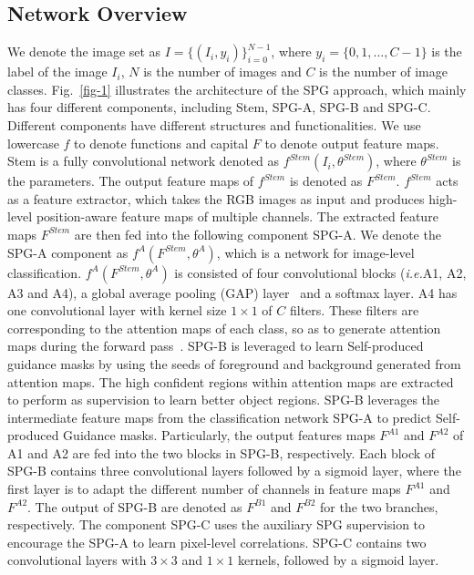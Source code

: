 \documentclass[runningheads]{llncs}
\newcommand{\ie}{\emph{i.e.}}
\begin{document}
\subsection{Network Overview}
We denote the image set as $I=\{(I_i, y_i)\}^{N-1}_{i=0}$, where $y_i = \{0,1,...,C-1\}$ is the label of the image $I_i$, $N$ is the number of images and $C$ is the number of image classes.
Fig.~\ref{fig-1} illustrates the architecture of the SPG approach, which mainly has four different components, including Stem, SPG-A, SPG-B and SPG-C.
Different components have different structures and functionalities.
We use lowercase $f$ to denote functions and capital $F$ to denote output feature maps.
Stem is a fully convolutional network denoted as $f^{Stem}(I_i,\theta^{Stem})$, where $\theta^{Stem}$ is the parameters. The output feature maps of $f^{Stem}$ is denoted as $F^{Stem}$.
$f^{Stem}$ acts as a feature extractor, which takes the RGB images as input and produces high-level position-aware feature maps of multiple channels.
The extracted feature maps $F^{Stem}$ are then fed into the following component SPG-A.
We denote the SPG-A component as $f^{A}(F^{Stem}, \theta^{A})$, which is a network for image-level classification.
 $f^{A}(F^{Stem}, \theta^{A})$ is consisted of four convolutional blocks (\ie A1, A2, A3 and A4), a global average pooling (GAP) layer~\cite{lin2013network} and a softmax layer.
A4 has one convolutional layer with kernel size $1 \times 1$ of $C$ filters.
These filters are corresponding to the attention maps of each class, so as to generate attention maps during the forward pass~\cite{zhang2018adversarial}.
SPG-B is leveraged to learn Self-produced guidance masks by using the seeds of foreground and background generated from attention maps.
The high confident regions within attention maps are extracted to perform as supervision to learn better object regions.
SPG-B leverages the intermediate feature maps from the classification network SPG-A to predict Self-produced Guidance masks.
Particularly, the output features maps $F^{A1}$ and $F^{A2}$ of A1 and A2 are fed into the two blocks in SPG-B, respectively.
Each block of SPG-B contains three convolutional layers followed by a sigmoid layer, where the first layer is to adapt the different number of channels in feature maps $F^{A1}$ and $F^{A2}$.
The output of SPG-B are denoted as $F^{B1}$ and $F^{B2}$ for the two branches, respectively.
The component SPG-C uses the auxiliary SPG supervision to encourage the SPG-A to learn pixel-level correlations.
SPG-C contains two convolutional layers with $3 \times 3$ and $1 \times 1$ kernels, followed by a sigmoid layer.
\end{document}
